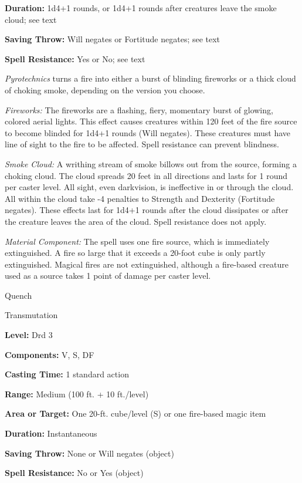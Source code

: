\documentclass{article}
\begin{document}
\textbf{Duration:} 1d4+1 rounds, or 1d4+1 rounds after creatures leave the smoke 
cloud; see text

\textbf{Saving Throw: }Will negates or Fortitude negates; see text

\textbf{Spell Resistance:} Yes or No; see text

\textit{Pyrotechnics }turns a fire into either a burst of blinding fireworks or 
a thick cloud of choking smoke, depending on the version you choose.

\textit{Fireworks: }The fireworks are a flashing, fiery, momentary burst of glowing, 
colored aerial lights. This effect causes creatures within 120 feet of the fire 
source to become blinded for 1d4+1 rounds (Will negates). These creatures must 
have line of sight to the fire to be affected. Spell resistance can prevent blindness.

\textit{Smoke Cloud: }A writhing stream of smoke billows out from the source, forming 
a choking cloud. The cloud spreads 20 feet in all directions and lasts for 1 round 
per caster level. All sight, even darkvision, is ineffective in or through the 
cloud. All within the cloud take -4 penalties to Strength and Dexterity (Fortitude 
negates). These effects last for 1d4+1 rounds after the cloud dissipates or after 
the creature leaves the area of the cloud. Spell resistance does not apply.

\textit{Material Component: }The spell uses one fire source, which is immediately 
extinguished. A fire so large that it exceeds a 20-foot cube is only partly extinguished. 
Magical fires are not extinguished, although a fire-based creature used as a source 
takes 1 point of damage per caster level.

\vspace{12pt}
Quench

Transmutation

\textbf{Level:} Drd 3

\textbf{Components:} V, S, DF

\textbf{Casting Time:} 1 standard action

\textbf{Range: }Medium (100 ft. + 10 ft./level)

\textbf{Area or Target:} One 20-ft. cube/level (S) or one fire-based magic item

\textbf{Duration:} Instantaneous

\textbf{Saving Throw:} None or Will negates (object)

\textbf{Spell Resistance:} No or Yes (object)
\end{document}
